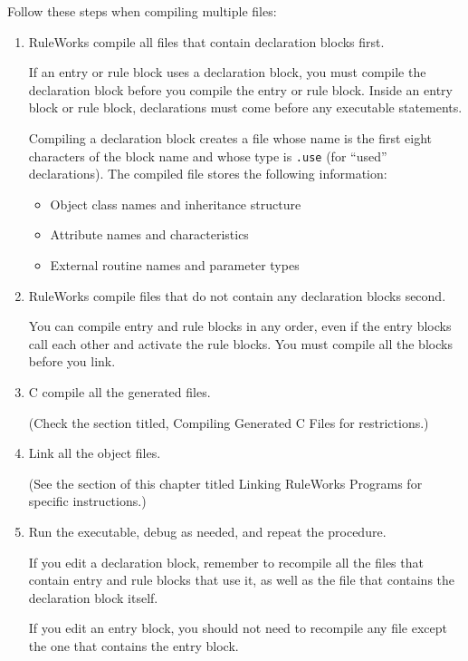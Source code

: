 Follow these steps when compiling multiple files:
\begin{enumerate}
\item RuleWorks compile all files that contain declaration blocks
  first.

  If an entry or rule block uses a declaration block, you must compile
  the declaration block before you compile the entry or rule
  block. Inside an entry block or rule block, declarations must come
  before any executable statements.

  Compiling a declaration block creates a file whose name is the first
  eight characters of the block name and whose type is \verb|.use|
  (for ``used'' declarations). The compiled file stores the following
  information:
  \begin{itemize}
  \item Object class names and inheritance structure
  \item Attribute names and characteristics 
  \item External routine names and parameter types
  \end{itemize}
  
\item RuleWorks compile files that do not contain any declaration
  blocks second.

  You can compile entry and rule blocks in any order, even if the
  entry blocks call each other and activate the rule blocks. You must
  compile all the blocks before you link.

\item C compile all the generated files.

  (Check the section titled, Compiling Generated C Files for
  restrictions.)

\item Link all the object files.

  (See the section of this chapter titled Linking RuleWorks Programs
  for specific instructions.)

\item Run the executable, debug as needed, and repeat the procedure.

  If you edit a declaration block, remember to recompile all the files
  that contain entry and rule blocks that use it, as well as the file
  that contains the declaration block itself.

  If you edit an entry block, you should not need to recompile any
  file except the one that contains the entry block.
\end{enumerate}


